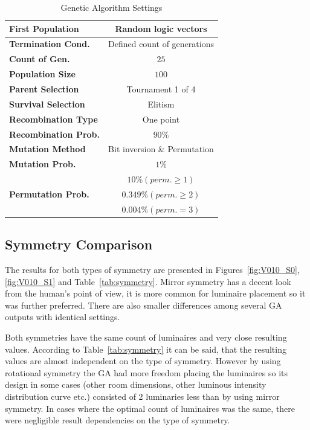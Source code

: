 \begin{table}[htb]
	\renewcommand{\arraystretch}{1.3}
	\caption{Genetic Algorithm Settings}
 	\label{tab:GAsettings}
	\centering
  \begin{tabular}{| l | c |}
    \hline
    \textbf{First Population} & Random logic vectors \\
    \hline
    \textbf{Termination Cond.} & Defined count of generations \\
    \hline
		\textbf{Count of Gen.} & $25$ \\
    \hline
		\textbf{Population Size} & $100$ \\
	\hline
		\textbf{Parent Selection} & Tournament 1 of 4 \\
    \hline
		\textbf{Survival Selection} & Elitism \\
	\hline
		\textbf{Recombination Type} & One point \\
    \hline
		\textbf{Recombination Prob.} & $90 \%$ \\
	\hline
		\textbf{Mutation Method} & Bit inversion \& Permutation\\
	\hline
		\textbf{Mutation Prob.} & $1 \%$ \\
	\hline
		& $10 \% \left( perm. \geq 1\right)$\\
		\textbf{Permutation Prob.} &  $0.349 \% \left( perm. \geq 2\right)$ \\
		&$0.004 \% \left( perm. = 3\right)$\\
    \hline
  \end{tabular}
\end{table}

\subsection{Symmetry Comparison}

The results for both types of symmetry are presented in Figures~\ref{fig:V010_S0}, \ref{fig:V010_S1} and Table~\ref{tab:symmetry}. Mirror symmetry has a decent look from the human's point of view, it is more common for luminaire placement so it was further preferred. There are also smaller differences among several GA outputs with identical settings.

Both symmetries have the same count of luminaires and very close resulting values. According to Table~\ref{tab:symmetry} it can be said, that the resulting values are almost independent on the type of symmetry. However by using rotational symmetry the GA had more freedom placing the luminaires so its design in some cases (other room dimensions, other luminous intensity distribution curve etc.) consisted of 2 luminaries less than by using mirror symmetry. In cases where the optimal count of luminaires was the same, there were negligible result dependencies on the type of symmetry.

